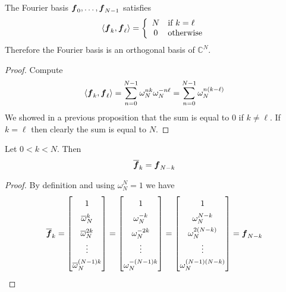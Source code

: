 \begin{proposition}
The Fourier basis $\boldsymbol{f}_0 , \dots, \boldsymbol{f}_{N-1}$ satisfies
$$
\langle \boldsymbol{f}_k , \boldsymbol{f}_{\ell} \rangle = \left\{ \begin{array}{cl} N & \text{if } k = \ell \\ 0 & \text{otherwise} \end{array} \right.
$$
Therefore the Fourier basis is an orthogonal basis of $\mathbb{C}^N$.

\begin{proof}
Compute
$$
\langle \boldsymbol{f}_k , \boldsymbol{f}_{\ell} \rangle
= \sum_{n=0}^{N-1} \omega_N^{nk} \omega_N^{-n\ell}
= \sum_{n=0}^{N-1} \omega_N^{n(k -\ell)}
$$
We showed in a previous proposition that the sum is equal to 0 if $k \not= \ell$. If $k = \ell$ then clearly the sum is equal to $N$.
\end{proof}
\end{proposition}

\begin{proposition}
Let $0<k<N$. Then
$$
\overline{\boldsymbol{f}}_k = \boldsymbol{f}_{N-k}
$$
\begin{proof}
By definition and using $\omega_N^N = 1$ we have
$$
\renewcommand{\arraystretch}{1.5}
\overline{\bs{f}}_k = \begin{bmatrix} 1 \\ \overline{\omega}^k_N \\ \overline{\omega}^{2k}_N \\ \vdots \\ \overline{\omega}^{(N-1)k}_N \end{bmatrix}
= \begin{bmatrix} 1 \\ \omega^{-k}_N \\ \omega^{-2k}_N \\ \vdots \\ \omega^{-(N-1)k}_N \end{bmatrix}
= \begin{bmatrix} 1 \\ \omega^{N-k}_N \\ \omega^{2(N-k)}_N \\ \vdots \\ \omega^{(N-1)(N-k)}_N \end{bmatrix}
= \bs{f}_{N-k}
\renewcommand{\arraystretch}{1}
$$
\end{proof}
\end{proposition}


